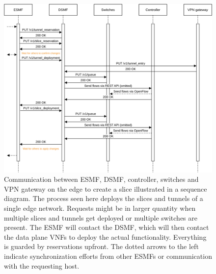 \begin{figure}[H]
  \centering
  \includegraphics[width=\linewidth]{images/chapter_6/slice_creation_edge.png}
  \caption[Slice creation on an edge network]{Communication between ESMF, DSMF, controller, switches and VPN gateway on the edge to create a slice illustrated in a sequence diagram. The process seen here deploys the slices and tunnels of a single edge network. Requests might be in larger quantity when multiple slices and tunnels get deployed or multiple switches are present. The ESMF will contact the DSMF, which will then contact the data plane VNFs to deploy the actual functionality. Everything is guarded by reservations upfront. The dotted arrows to the left indicate synchronization efforts from other ESMFs or communication with the requesting host.}
  \label{fig:slice_creation_edge}
\end{figure}
